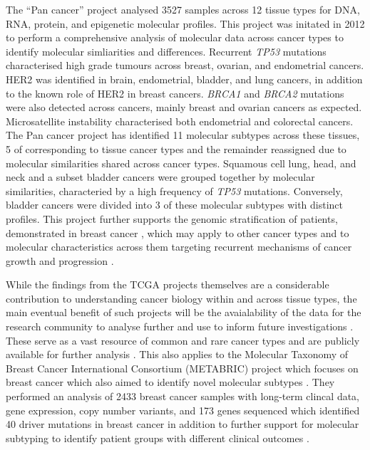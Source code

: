 The ``\gls{Pan cancer}'' project \citep{TCGA2013PAN,TCGA2014PAN} analysed 3527 samples across 12 tissue types for DNA, RNA, protein, and epigenetic molecular profiles. This project was initated in 2012 to perform a comprehensive analysis of molecular data across cancer types to identify molecular simliarities and differences. Recurrent \textit{TP53} mutations characterised high grade tumours across breast, ovarian, and endometrial cancers. HER2 was identified in brain, endometrial, bladder, and lung cancers, in addition to the known role of HER2 in breast cancers. \textit{BRCA1} and \textit{BRCA2} mutations were also detected across cancers, mainly breast and ovarian cancers as expected. Microsatellite instability characterised both endometrial and colorectal cancers.  The Pan cancer project \citep{TCGA2014PAN} has identified 11 molecular subtypes across these tissues,  5 of corresponding to tissue cancer types and the remainder reassigned due to molecular similarities shared across cancer types. Squamous cell lung, head, and neck and a subset bladder cancers were grouped together by molecular similarities, characteried by a high frequency of \textit{TP53} mutations. Conversely, bladder cancers were divided into 3 of these molecular subtypes with distinct profiles. This project further supports the genomic stratification of patients, demonstrated in breast cancer \citep{Perou2000, Parker2009, METABRIC2016}, which may apply to other cancer types and to molecular characteristics across them targeting recurrent mechanisms of cancer growth and progression \citep{Hanahan2000, Hanahan2011}.

While the findings from the \gls{TCGA} projects themselves are a considerable contribution to understanding cancer biology within and across tissue types, the main eventual benefit of such projects will be the avaialability of the data for the research community to analyse further and use to inform future investigations \citep{TCGA2008GBM, TCGA2013PAN, TCGA2017web}. These serve as a vast resource of common and rare cancer types and are publicly available for further analysis \citep{cBioPortal, TCGA2017web, ICGC2011}. This also applies to the Molecular Taxonomy of Breast Cancer International Consortium (METABRIC) project which focuses on breast cancer which also aimed to identify novel molecular subtypes \citep{METABRIC2012}. They performed an analysis of 2433 breast cancer samples with long-term clincal data,  gene expression, copy number variants, and 173 genes sequenced which identified 40 driver mutations in breast cancer in addition to further support for molecular subtyping to identify patient groups with different clinical outcomes \citep{METABRIC2016}.



